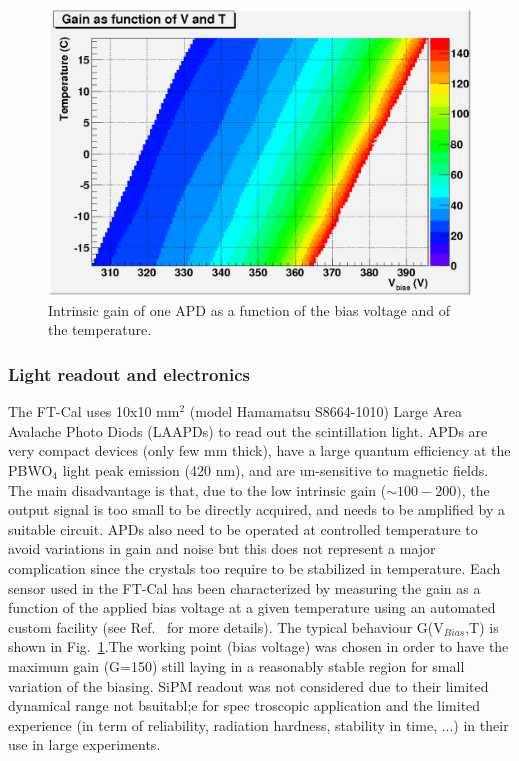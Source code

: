 \begin{figure}[th!]
\centering 
\includegraphics[width=1.0\columnwidth]{./fig/apd5.eps} 
\caption{Intrinsic gain of one APD as a function
of the bias voltage and of the temperature.}
\label{fig:G-V-T} 
\end{figure}

\subsubsection{Light readout and electronics }
The FT-Cal uses 10x10 mm$^2$ (model Hamamatsu S8664-1010) Large Area Avalache Photo Diods (LAAPDs) to read out the scintillation light. APDs are very compact devices (only few mm thick),  have a large quantum efficiency at the PBWO$_4$ light peak emission (420 nm), and  are un-sensitive to magnetic fields. The main disadvantage is that, due to
the low intrinsic gain ($\sim 100-200)$, the output signal is too small to be directly acquired, and needs to be amplified
by a suitable circuit. APDs also need
to be operated at controlled temperature to
avoid variations in gain and noise but this does not represent a major complication since the crystals too require to be stabilized in temperature.
Each sensor used in the FT-Cal has been characterized by measuring the gain as a function of the applied bias voltage at a given temperature using an automated  custom facility (see Ref.~\cite{celeAPD} for more details). The typical behaviour G(V$_{Bias}$,T) is shown in Fig.~\ref{fig:G-V-T}.The working point (bias voltage) was chosen in order to have the maximum  gain (G=150) still laying in a reasonably stable region for small variation of the biasing. SiPM readout was not considered due to their limited dynamical range not bsuitabl;e for spec troscopic application and the limited experience (in term of reliability, radiation hardness, stability in time, ...) in their use in large experiments.\\

